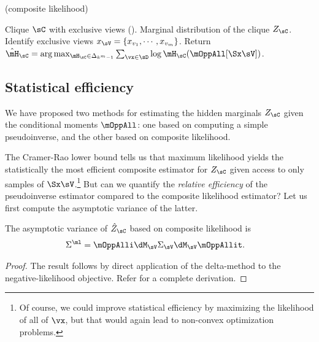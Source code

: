 \begin{algorithm}
  \caption{\LearnClique (composite likelihood)}
  \label{algo:piecewise}
  \begin{algorithmic}
    \REQUIRE Clique $\sC$ with exclusive views ().
    \ENSURE Marginal distribution of the clique $Z_\sC$.
\STATE Identify exclusive views $x_\sV = \{x_{v_1}, \cdots, x_{v_m}\}$.
\STATE Return $\hat \mH_\sC = \arg\max_{\mH_\sC \in \Delta_{k^m-1}} \sum_{\vx \in \sD} \log \mH_\sC(\mOppAll[\Sx \sV])$.
  \end{algorithmic}
\end{algorithm}

\subsection{Statistical efficiency}

We have proposed two methods for estimating the hidden marginals $Z_\sC$ given
the conditional moments $\mOppAll$: one based on computing a simple pseudoinverse,
and the other based on composite likelihood.

The Cramer-Rao lower bound tells us that maximum likelihood yields
the statistically the most efficient composite estimator for $Z_\sC$
given access to only samples of $\Sx\sV$.\footnote{Of course, we could improve statistical efficiency
by maximizing the likelihood of all of $\vx$, but that would again lead to non-convex optimization problems.}
But can we quantify the \emph{relative efficiency} of the pseudoinverse estimator
compared to the composite likelihood estimator?
Let us first compute the asymptotic variance of the latter.

\begin{lemma}
  \label{lem:pw-variance}
  The asymptotic variance of $\hat Z_{\sC}$ based on composite likelihood is
  \begin{align*}
    \Sigma^{\ml} &= \mOppAlli \dM_\sV \Sigma_\sV \dM_\sV \mOppAllit.
  \end{align*}
\end{lemma}
\begin{proof}
  The result follows by direct application of the delta-method
  \cite{vaart98asymptotic} to the negative-likelihood objective. Refer
   for a complete derivation.
\end{proof}


